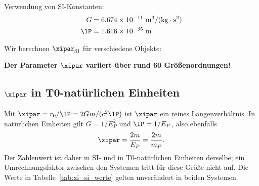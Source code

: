 	Verwendung von SI-Konstanten:
	\begin{align}
		G &= 6.674 \times 10^{-11} \text{ m}^3/(\text{kg} \cdot \text{s}^2) \\
		\lP &= 1.616 \times 10^{-35} \text{ m}
	\end{align}
	
	Wir berechnen $\xipar_{\text{SI}}$ für verschiedene Objekte:
	
	\begin{table}[htbp]
		\centering
		\caption{$\xipar$-Werte für verschiedene Objekte in SI-Einheiten}
		\label{tab:xi_si_werte}
	\end{table}
	
	\textbf{Der Parameter $\xipar$ variiert über rund 60 Größenordnungen!}
	
	\subsection{$\xipar$ in T0-natürlichen Einheiten}
	\label{subsec:xi_transformation}
	
	Mit $\xipar = r_0/\lP = 2Gm/(c^2\lP)$ ist $\xipar$ ein reines Längenverhältnis. In natürlichen Einheiten gilt $G = 1/E_P^2$ und $\lP = 1/E_P$, also ebenfalls
	\begin{equation}
		\xipar = \frac{2m}{E_P} = \frac{2m}{m_P}.
	\end{equation}
	Der Zahlenwert ist daher in SI- und in T0-natürlichen Einheiten derselbe; ein Umrechnungsfaktor zwischen den Systemen tritt für diese Größe nicht auf. Die Werte in Tabelle~\ref{tab:xi_si_werte} gelten unverändert in beiden Systemen.
	
